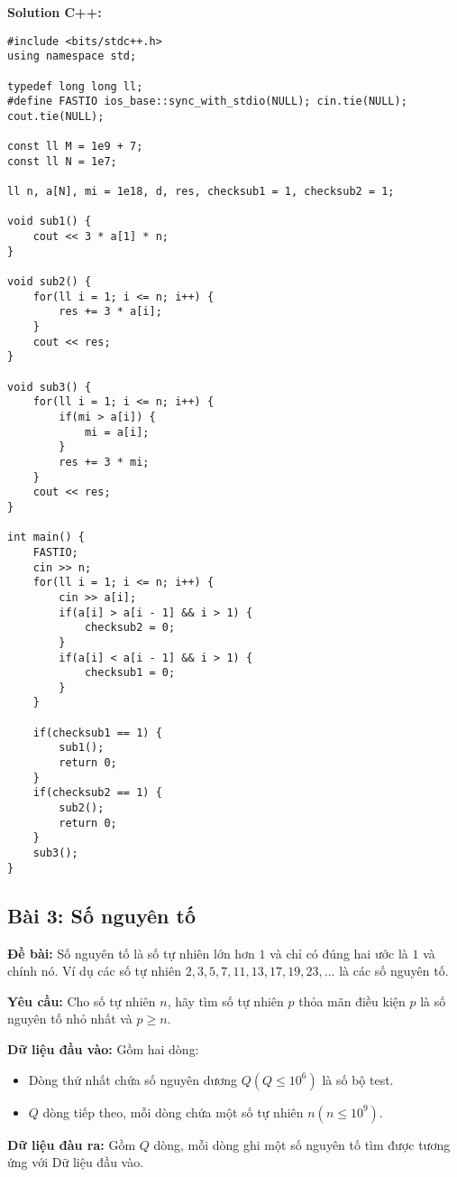 \documentclass[12pt]{scrartcl}  %
\begin{document}
\textbf{Solution C++:}

\begin{lstlisting}
#include <bits/stdc++.h>
using namespace std;

typedef long long ll;
#define FASTIO ios_base::sync_with_stdio(NULL); cin.tie(NULL); cout.tie(NULL);

const ll M = 1e9 + 7;
const ll N = 1e7;

ll n, a[N], mi = 1e18, d, res, checksub1 = 1, checksub2 = 1;

void sub1() {
    cout << 3 * a[1] * n;
}

void sub2() {
    for(ll i = 1; i <= n; i++) {
        res += 3 * a[i];
    }
    cout << res;
}

void sub3() {
    for(ll i = 1; i <= n; i++) {
        if(mi > a[i]) {
            mi = a[i];
        }
        res += 3 * mi;
    }
    cout << res;
}

int main() {
    FASTIO;
    cin >> n;
    for(ll i = 1; i <= n; i++) {
        cin >> a[i];
        if(a[i] > a[i - 1] && i > 1) {
            checksub2 = 0;
        }
        if(a[i] < a[i - 1] && i > 1) {
            checksub1 = 0;
        }
    }

    if(checksub1 == 1) {
        sub1();
        return 0;
    }
    if(checksub2 == 1) {
        sub2();
        return 0;
    }
    sub3();
}

\end{lstlisting}

\subsection{Bài 3: Số nguyên tố}
\textbf{Đề bài:}
Số nguyên tố là số tự nhiên lớn hơn $1$ và chỉ có đúng hai ước là $1$ và chính nó. Ví dụ các số tự nhiên $2, 3, 5, 7, 11, 13, 17, 19, 23, ...$ là các số nguyên tố.

\textbf{Yêu cầu:}
Cho số tự nhiên $n$, hãy tìm số tự nhiên $p$ thỏa mãn điều kiện $p$ là số nguyên tố nhỏ nhất và $p \geq n$.

\textbf{Dữ liệu đầu vào:}
Gồm hai dòng:
\begin{itemize}
    \item Dòng thứ nhất chứa số nguyên dương $Q (Q \leq 10^6)$ là số bộ test. 
    \item $Q$ dòng tiếp theo, mỗi dòng chứa một số tự nhiên $n (n \leq 10^9)$.
\end{itemize}

\textbf{Dữ liệu đàu ra:}
Gồm $Q$ dòng, mỗi dòng ghi một số nguyên tố tìm được tương ứng với Dữ liệu đầu vào.
\end{document}
